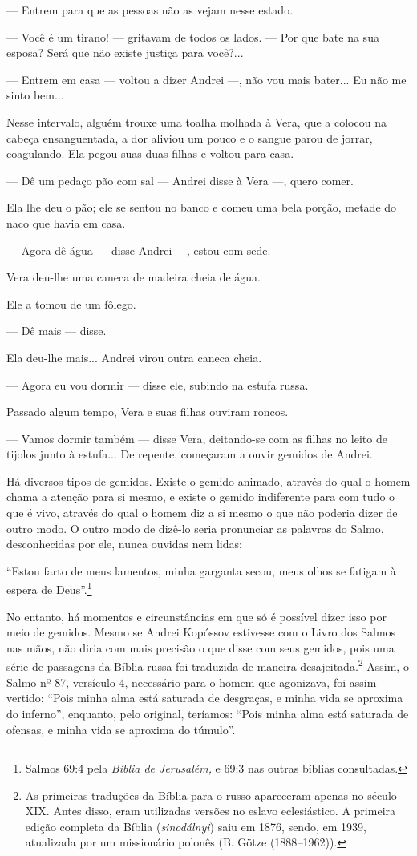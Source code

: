 --- Entrem para que as pessoas não as vejam nesse estado.

--- Você é um tirano! --- gritavam de todos os lados. --- Por que bate
na sua esposa? Será que não existe justiça para você?...

--- Entrem em casa --- voltou a dizer Andrei ---, não vou mais bater...
Eu não me sinto bem...

Nesse intervalo, alguém trouxe uma toalha molhada à Vera, que a colocou
na cabeça ensanguentada, a dor aliviou um pouco e o sangue parou de
jorrar, coagulando. Ela pegou suas duas filhas e voltou para casa.

--- Dê um pedaço pão com sal --- Andrei disse à Vera ---, quero comer.

Ela lhe deu o pão; ele se sentou no banco e comeu uma bela porção,
metade do naco que havia em casa.

--- Agora dê água --- disse Andrei ---, estou com sede.

Vera deu-lhe uma caneca de madeira cheia de água.

Ele a tomou de um fôlego.

--- Dê mais --- disse.

Ela deu-lhe mais... Andrei virou outra caneca cheia.

--- Agora eu vou dormir --- disse ele, subindo na estufa russa.

Passado algum tempo, Vera e suas filhas ouviram roncos.

--- Vamos dormir também --- disse Vera, deitando-se com as filhas no
leito de tijolos junto à estufa... De repente, começaram a ouvir gemidos
de Andrei.

Há diversos tipos de gemidos. Existe o gemido animado, através do qual o
homem chama a atenção para si mesmo, e existe o gemido indiferente para
com tudo o que é vivo, através do qual o homem diz a si mesmo o que não
poderia dizer de outro modo. O outro modo de dizê-lo seria pronunciar as
palavras do Salmo, desconhecidas por ele, nunca ouvidas nem lidas:

``Estou farto de meus lamentos, minha garganta secou, meus olhos se
fatigam à espera de Deus''.\footnote{Salmos 69:4 pela \emph{Bíblia de
  Jerusalém,} e 69:3 nas outras bíblias consultadas.}

No entanto, há momentos e circunstâncias em que só é possível dizer isso
por meio de gemidos. Mesmo se Andrei Kopóssov estivesse com o Livro dos
Salmos nas mãos, não diria com mais precisão o que disse com seus
gemidos, pois uma série de passagens da Bíblia russa foi traduzida de
maneira desajeitada.\footnote{As primeiras traduções da Bíblia para o
  russo apareceram apenas no século XIX. Antes disso, eram utilizadas
  versões no eslavo eclesiástico. A primeira edição completa da Bíblia
  (\emph{sinodálnyi}) saiu em 1876, sendo, em 1939, atualizada por um
  missionário polonês (B. Götze (1888\emph{--}1962)).} Assim, o Salmo nº
87, versículo 4, necessário para o homem que agonizava, foi assim
vertido: ``Pois minha alma está saturada de desgraças, e minha vida se
aproxima do inferno'', enquanto, pelo original, teríamos: ``Pois minha
alma está saturada de ofensas, e minha vida se aproxima do túmulo''.

